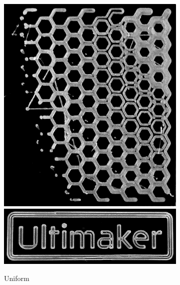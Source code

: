 \begin{figure}
\centering
\setlength{\figheight}{.38\columnwidth}
\setlength{\figheightTwo}{.47\columnwidth}
\setlength{\figwidth}{0.32\columnwidth}
\begin{subfigure}{\figwidth}\centering
\includegraphics[height=\figheight]{sources/applications/P3_print_hex_naive_edited.png}
\includegraphics[width=\figwidth]{sources/applications/P3_print_UM_naive_edited.png}
\caption{Uniform}\label{print_naive}
\end{subfigure}
\begin{subfigure}{\figwidth}\centering

\end{subfigure}
\end{figure}
